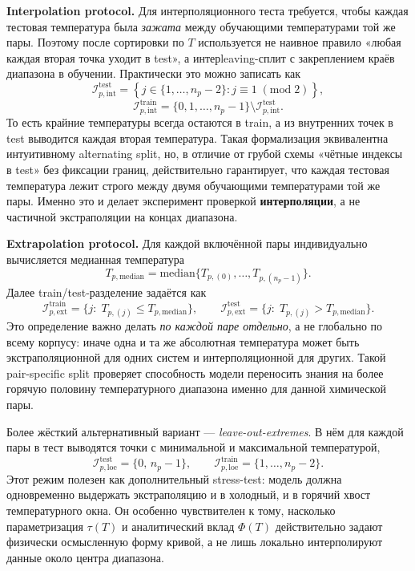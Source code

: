 \documentclass[11pt]{article}
\begin{document}
\textbf{Interpolation protocol.} Для интерполяционного теста требуется, чтобы каждая тестовая температура была \textit{зажата} между обучающими температурами той же пары. Поэтому после сортировки по $T$ используется не наивное правило «любая каждая вторая точка уходит в test», а интерleaving-сплит с закреплением краёв диапазона в обучении. Практически это можно записать как
\begin{equation*}
\mathcal{I}^{\mathrm{test}}_{p,\mathrm{int}} = \left\{j\in\{1,\dots,n_p-2\}: j\equiv 1\; (\mathrm{mod}\;2)\right\},
\end{equation*}
\begin{equation*}
\mathcal{I}^{\mathrm{train}}_{p,\mathrm{int}} = \{0,1,\dots,n_p-1\}\setminus \mathcal{I}^{\mathrm{test}}_{p,\mathrm{int}}.
\end{equation*}
То есть крайние температуры всегда остаются в train, а из внутренних точек в test выводится каждая вторая температура. Такая формализация эквивалентна интуитивному alternating split, но, в отличие от грубой схемы «чётные индексы в test» без фиксации границ, действительно гарантирует, что каждая тестовая температура лежит строго между двумя обучающими температурами той же пары. Именно это и делает эксперимент проверкой \textbf{интерполяции}, а не частичной экстраполяции на концах диапазона.

\textbf{Extrapolation protocol.} Для каждой включённой пары индивидуально вычисляется медианная температура
\begin{equation*}
T_{p,\mathrm{median}} = \mathrm{median}\{T_{p,(0)},\dots,T_{p,(n_p-1)}\}.
\end{equation*}
Далее train/test-разделение задаётся как
\begin{equation*}
\mathcal{I}^{\mathrm{train}}_{p,\mathrm{ext}} = \{j:\; T_{p,(j)} \leq T_{p,\mathrm{median}}\},
\qquad
\mathcal{I}^{\mathrm{test}}_{p,\mathrm{ext}} = \{j:\; T_{p,(j)} > T_{p,\mathrm{median}}\}.
\end{equation*}
Это определение важно делать \textit{по каждой паре отдельно}, а не глобально по всему корпусу: иначе одна и та же абсолютная температура может быть экстраполяционной для одних систем и интерполяционной для других. Такой pair-specific split проверяет способность модели переносить знания на более горячую половину температурного диапазона именно для данной химической пары.

Более жёсткий альтернативный вариант --- \textit{leave-out-extremes}. В нём для каждой пары в тест выводятся точки с минимальной и максимальной температурой,
\begin{equation*}
\mathcal{I}^{\mathrm{test}}_{p,\mathrm{loe}} = \{0,\, n_p-1\},
\qquad
\mathcal{I}^{\mathrm{train}}_{p,\mathrm{loe}} = \{1,\dots,n_p-2\}.
\end{equation*}
Этот режим полезен как дополнительный stress-test: модель должна одновременно выдержать экстраполяцию и в холодный, и в горячий хвост температурного окна. Он особенно чувствителен к тому, насколько параметризация $\tau(T)$ и аналитический вклад $\Phi(T)$ действительно задают физически осмысленную форму кривой, а не лишь локально интерполируют данные около центра диапазона.
\end{document}
